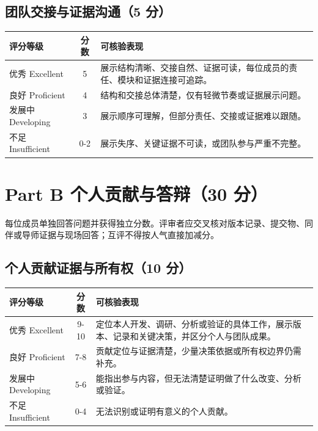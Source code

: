 \documentclass[11pt]{article}
\newcommand{\formaltable}{%
  \small
  \setlength{\tabcolsep}{5pt}%
  \renewcommand{\arraystretch}{1.2}%
  \setlength{\arrayrulewidth}{0.4pt}%
}
\renewcommand{\arraystretch}{1.2}
\begin{document}
\subsection{团队交接与证据沟通（5 分）}
\begin{center}
\formaltable
\begin{tabularx}{\textwidth}{|l|c|Y|}
\hline
\textbf{评分等级} & \textbf{分数} & \textbf{可核验表现} \\ \hline
优秀 Excellent & 5 & 展示结构清晰、交接自然、证据可读，每位成员的责任、模块和证据连接可追踪。 \\ \hline
良好 Proficient & 4 & 结构和交接总体清楚，仅有轻微节奏或证据展示问题。 \\ \hline
发展中 Developing & 3 & 展示顺序可理解，但部分责任、交接或证据难以跟随。 \\ \hline
不足 Insufficient & 0-2 & 展示失序、关键证据不可读，或团队参与严重不完整。 \\ \hline
\end{tabularx}
\end{center}

\section{Part B 个人贡献与答辩（30 分）}
每位成员单独回答问题并获得独立分数。评审者应交叉核对版本记录、提交物、同伴或导师证据与现场回答；互评不得按人气直接加减分。

\subsection{个人贡献证据与所有权（10 分）}
\begin{center}
\formaltable
\begin{tabularx}{\textwidth}{|l|c|Y|}
\hline
\textbf{评分等级} & \textbf{分数} & \textbf{可核验表现} \\ \hline
优秀 Excellent & 9-10 & 定位本人开发、调研、分析或验证的具体工作，展示版本、记录和关键决策，并区分个人与团队成果。 \\ \hline
良好 Proficient & 7-8 & 贡献定位与证据清楚，少量决策依据或所有权边界仍需补充。 \\ \hline
发展中 Developing & 5-6 & 能指出参与内容，但无法清楚证明做了什么改变、分析或验证。 \\ \hline
不足 Insufficient & 0-4 & 无法识别或证明有意义的个人贡献。 \\ \hline
\end{tabularx}
\end{center}
\end{document}
